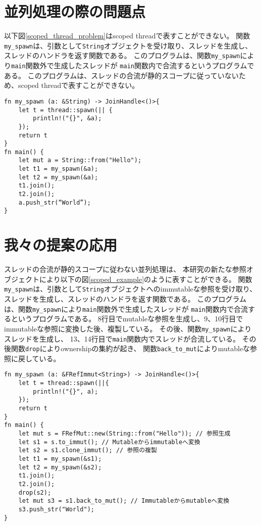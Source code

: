 \documentclass{sumiilab-paper}
\theoremstyle{mystyle}
\numberwithin{definition}{chapter} %
\begin{document}
\section{並列処理の際の問題点}
以下図\ref{scoped_thread_problem}はscoped threadで表すことができない。
関数\texttt{my\_spawn}は、引数として\texttt{String}オブジェクトを受け取り、スレッドを生成し、
スレッドのハンドラを返す関数である。
このプログラムは、関数\texttt{my\_spawn}により\texttt{main}関数外で生成したスレッドが
\texttt{main}関数内で合流するというプログラムである。
このプログラムは、スレッドの合流が静的スコープに従っていないため、scoped threadで表すことができない。
\begin{lstlisting}[caption=scoped threadで表せない例, 
  label=scoped_thread_problem, captionpos=b]
fn my_spawn (a: &String) -> JoinHandle<()>{
    let t = thread::spawn(|| {
        println!("{}", &a);
    });
    return t
}
fn main() {
    let mut a = String::from("Hello");
    let t1 = my_spawn(&a);
    let t2 = my_spawn(&a);
    t1.join();
    t2.join();
    a.push_str(“World”);
}
\end{lstlisting}

\section{我々の提案の応用}
スレッドの合流が静的スコープに従わない並列処理は、
本研究の新たな参照オブジェクトにより以下の図\ref{scoped_example}のように表すことができる。
関数\texttt{my\_spawn}は、引数として\texttt{String}オブジェクトへのimmutableな参照を受け取り、
スレッドを生成し、スレッドのハンドラを返す関数である。
このプログラムは、関数\texttt{my\_spawn}により\texttt{main}関数外で生成したスレッドが
\texttt{main}関数内で合流するというプログラムである。
8行目でmutableな参照を生成し、9、10行目でimmutableな参照に変換した後、複製している。
その後、関数\texttt{my\_spawn}によりスレッドを生成し、
13、14行目で\texttt{main}関数内でスレッドが合流している。
その後関数\texttt{drop}によりownershipの集約が起き、
関数\texttt{back\_to\_mut}によりmutableな参照に戻している。
\begin{lstlisting}[caption=新たな参照オブジェクトを用いた並列処理の例, 
  label=scoped_example, captionpos=b]
fn my_spawn (a: &FRefImmut<String>) -> JoinHandle<()>{
    let t = thread::spawn(||{
        println!("{}", a);
    });
    return t
}
fn main() {
    let mut s = FRefMut::new(String::from("Hello")); // 参照生成
    let s1 = s.to_immut(); // Mutableからimmutableへ変換
    let s2 = s1.clone_immut(); // 参照の複製
    let t1 = my_spawn(&s1);
    let t2 = my_spawn(&s2); 
    t1.join();
    t2.join();
    drop(s2);
    let mut s3 = s1.back_to_mut(); // Immutableからmutableへ変換
    s3.push_str("World");
}
\end{lstlisting}
\end{document}
